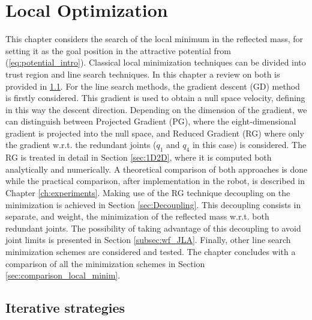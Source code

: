 \chapter{Local Optimization}
\label{ch:localoptimization}



This chapter considers the search of the 
local minimum in the reflected mass, for setting it as the goal position in the attractive potential from (\ref{eq:potential_intro}). Classical local minimization techniques can be divided  into trust region and line search   techniques. In this chapter a review on both is provided in \ref{sec:iterative_strategies}. For the line search methods, the gradient descent (GD) method is firstly considered. This gradient is used to obtain a null space velocity,  defining in this way the descent direction. Depending on the dimension of the gradient, we can distinguish between Projected Gradient (PG), where the eight-dimensional gradient is projected into the null space, and Reduced Gradient (RG) where only the gradient w.r.t. the redundant joints ($q_1$ and $q_4$ in this case) is considered. The RG is treated in detail in Section \ref{sec:1D2D}, where it is computed both analytically and numerically.  
A theoretical comparison of both approaches is done while the practical comparison, after implementation in the robot, is described in  Chapter \ref{ch:experiments}. Making use of the RG technique decoupling on the minimization is achieved in Section \ref{sec:Decoupling}. This decoupling consists in separate, and weight, the minimization of the reflected mass w.r.t. both redundant joints. The possibility of taking advantage of this decoupling to avoid joint limits is presented in Section \ref{subsec:wf_JLA}.
Finally, other line search minimization schemes are considered and tested. The chapter concludes with a comparison of all the minimization schemes in  Section \ref{sec:comparison_local_minim}.






\section{Iterative strategies}
\label{sec:iterative_strategies}

